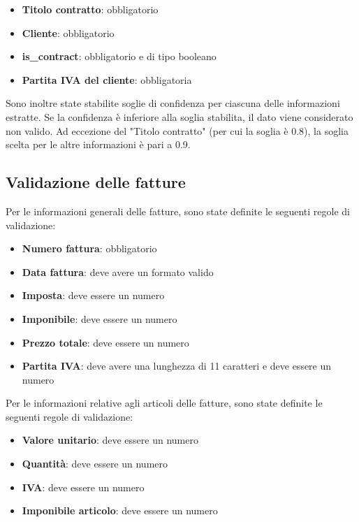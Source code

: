 \begin{itemize}
    \item \textbf{Titolo contratto}: obbligatorio
    \item \textbf{Cliente}: obbligatorio
    \item \textbf{is\_contract}: obbligatorio e di tipo booleano
    \item \textbf{Partita IVA del cliente}: obbligatoria
\end{itemize}

Sono inoltre state stabilite soglie di confidenza per ciascuna delle informazioni estratte. Se la confidenza è inferiore alla soglia stabilita, il dato viene considerato non valido. Ad eccezione del "Titolo contratto" (per cui la soglia è 0.8), la soglia scelta per le altre informazioni è pari a 0.9.

\subsection{Validazione delle fatture}
\label{subsec:validazione-fatture}
Per le informazioni generali delle fatture, sono state definite le seguenti regole di validazione:

\begin{itemize}
    \item \textbf{Numero fattura}: obbligatorio
    \item \textbf{Data fattura}: deve avere un formato valido
    \item \textbf{Imposta}: deve essere un numero
    \item \textbf{Imponibile}: deve essere un numero
    \item \textbf{Prezzo totale}: deve essere un numero
    \item \textbf{Partita IVA}: deve avere una lunghezza di 11 caratteri e deve essere un numero
\end{itemize}

Per le informazioni relative agli articoli delle fatture, sono state definite le seguenti regole di validazione:

\begin{itemize}
    \item \textbf{Valore unitario}: deve essere un numero
    \item \textbf{Quantità}: deve essere un numero
    \item \textbf{IVA}: deve essere un numero
    \item \textbf{Imponibile articolo}: deve essere un numero
\end{itemize}


